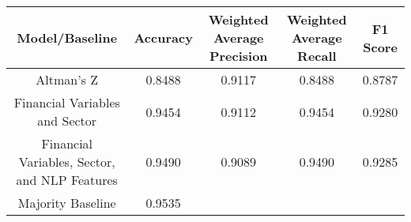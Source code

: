 \footnotesize
\begin{tabular}{ccccc}
\toprule
Model/Baseline & Accuracy & Weighted Average Precision & Weighted Average Recall & F1 Score \\
\midrule
Altman's Z & 0.8488 & 0.9117 & 0.8488 & 0.8787 \\
Financial Variables and Sector & 0.9454 & 0.9112 & 0.9454 & 0.9280 \\
Financial Variables, Sector, and NLP Features & 0.9490 & 0.9089 & 0.9490 & 0.9285 \\
Majority Baseline & 0.9535 &  &  &  \\
\bottomrule
\end{tabular}

\normalsize
